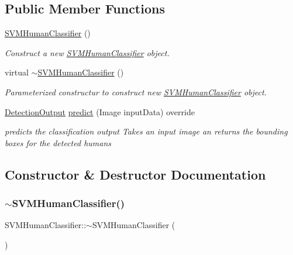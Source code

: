\subsection*{Public Member Functions}
\begin{DoxyCompactItemize}
\item 
\mbox{\label{classSVMHumanClassifier_ab99099674465b0ffa8c79feeb9b9b66a}} 
\hyperlink{classSVMHumanClassifier_ab99099674465b0ffa8c79feeb9b9b66a}{S\+V\+M\+Human\+Classifier} ()
\begin{DoxyCompactList}\small\item\em Construct a new \hyperlink{classSVMHumanClassifier}{S\+V\+M\+Human\+Classifier} object. \end{DoxyCompactList}\item 
virtual \hyperlink{classSVMHumanClassifier_a875ce0f61e85c8254f008b29f2c3a9b9}{$\sim$\+S\+V\+M\+Human\+Classifier} ()
\begin{DoxyCompactList}\small\item\em Parameterized constructur to construct new \hyperlink{classSVMHumanClassifier}{S\+V\+M\+Human\+Classifier} object. \end{DoxyCompactList}\item 
\hyperlink{classData}{Detection\+Output} \hyperlink{classSVMHumanClassifier_a14a416a22355b1426d7611082dfa2464}{predict} (Image input\+Data) override
\begin{DoxyCompactList}\small\item\em predicts the classification output Takes an input image an returns the bounding boxes for the detected humans \end{DoxyCompactList}\end{DoxyCompactItemize}


\subsection{Constructor \& Destructor Documentation}
\mbox{\label{classSVMHumanClassifier_a875ce0f61e85c8254f008b29f2c3a9b9}} 
\subsubsection{\texorpdfstring{$\sim$\+S\+V\+M\+Human\+Classifier()}{~SVMHumanClassifier()}}
{\footnotesize\ttfamily S\+V\+M\+Human\+Classifier\+::$\sim$\+S\+V\+M\+Human\+Classifier (\begin{DoxyParamCaption}{ }\end{DoxyParamCaption})\hspace{0.3cm}{\ttfamily [virtual]}}



